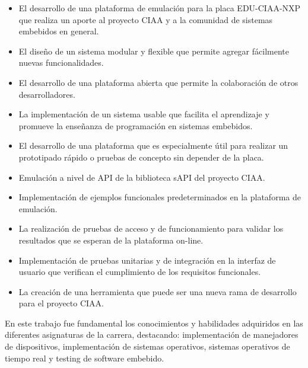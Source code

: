\begin{itemize}

\item El desarrollo de una plataforma de emulación para la placa EDU-CIAA-NXP que realiza un aporte al proyecto CIAA y a la comunidad de sistemas
embebidos en general.

\item El diseño de un sistema modular y flexible que permite agregar fácilmente nuevas
funcionalidades.

\item El desarrollo de una plataforma abierta que permite la colaboración de otros desarrolladores.

\item La implementación de un sistema usable que facilita el aprendizaje y promueve la enseñanza de
programación en sistemas embebidos.

\item El desarrollo de una plataforma que es especialmente útil para realizar un prototipado rápido o pruebas de concepto sin depender de la placa.

\item Emulación a nivel de API de la biblioteca sAPI del proyecto CIAA.

\item Implementación de ejemplos funcionales predeterminados en la plataforma de emulación.

\item La realización de pruebas de acceso y de funcionamiento para validar los resultados que se esperan de la plataforma on-line.

\item Implementación de pruebas unitarias y de integración en la interfaz de usuario que verifican el cumplimiento de los requisitos funcionales.

\item La creación de una herramienta que puede ser una nueva rama de desarrollo para el proyecto CIAA.

\end{itemize}

En este trabajo fue fundamental los conocimientos y habilidades adquiridos en las diferentes asignaturas de la carrera,  destacando: implementación de manejadores de dispositivos, implementación de sistemas operativos, sistemas operativos de tiempo real y testing de software embebido.

